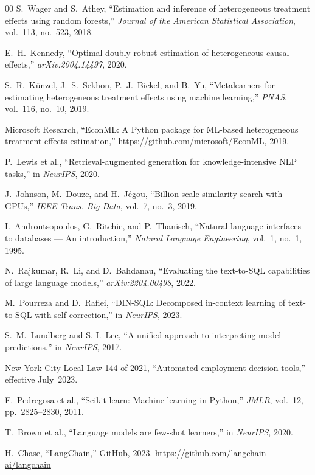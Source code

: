 \documentclass[conference]{IEEEtran}
\begin{document}
\begin{thebibliography}{00}
 S.~Wager and S.~Athey, ``Estimation and
inference of heterogeneous treatment effects using random forests,''
\emph{Journal of the American Statistical Association}, vol.~113,
no.~523, 2018.

 E.~H.~Kennedy, ``Optimal doubly robust
estimation of heterogeneous causal effects,''
\emph{arXiv:2004.14497}, 2020.

 S.~R.~K\"unzel, J.~S.~Sekhon, P.~J.~Bickel, and
B.~Yu, ``Metalearners for estimating heterogeneous treatment
effects using machine learning,''
\emph{PNAS}, vol.~116, no.~10, 2019.

 Microsoft Research, ``EconML: A Python package
for ML-based heterogeneous treatment effects estimation,''
\url{https://github.com/microsoft/EconML}, 2019.

 P.~Lewis et al., ``Retrieval-augmented
generation for knowledge-intensive NLP tasks,''
in \emph{NeurIPS}, 2020.

 J.~Johnson, M.~Douze, and H.~J\'egou,
``Billion-scale similarity search with GPUs,''
\emph{IEEE Trans. Big Data}, vol.~7, no.~3, 2019.

 I.~Androutsopoulos, G.~Ritchie, and
P.~Thanisch, ``Natural language interfaces to databases --- An
introduction,''
\emph{Natural Language Engineering}, vol.~1, no.~1, 1995.

 N.~Rajkumar, R.~Li, and D.~Bahdanau,
``Evaluating the text-to-SQL capabilities of large language
models,'' \emph{arXiv:2204.00498}, 2022.

 M.~Pourreza and D.~Rafiei, ``DIN-SQL:
Decomposed in-context learning of text-to-SQL with self-correction,''
in \emph{NeurIPS}, 2023.

 S.~M.~Lundberg and S.-I.~Lee, ``A unified
approach to interpreting model predictions,'' in \emph{NeurIPS},
2017.

 New York City Local Law 144 of 2021,
``Automated employment decision tools,'' effective July~2023.

 F.~Pedregosa et al., ``Scikit-learn: Machine
learning in Python,'' \emph{JMLR}, vol.~12, pp.~2825--2830, 2011.

 T.~Brown et al., ``Language models are few-shot
learners,'' in \emph{NeurIPS}, 2020.

 H.~Chase, ``LangChain,'' GitHub, 2023.
\url{https://github.com/langchain-ai/langchain}

\end{thebibliography}
\end{document}

